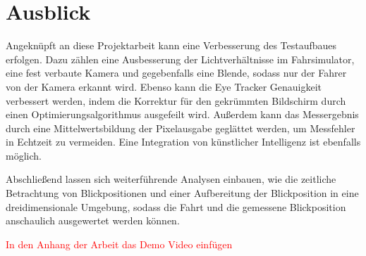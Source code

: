 \section{Ausblick}

Angeknüpft an diese Projektarbeit kann eine Verbesserung des Testaufbaues erfolgen. Dazu zählen eine Ausbesserung der Lichtverhältnisse im Fahrsimulator, eine fest verbaute Kamera und gegebenfalls eine Blende, sodass nur der Fahrer von der Kamera erkannt wird. Ebenso kann die Eye Tracker Genauigkeit verbessert werden, indem die Korrektur für den gekrümmten Bildschirm durch einen Optimierungsalgorithmus ausgefeilt wird. Außerdem kann das Messergebnis durch eine Mittelwertsbildung der Pixelausgabe geglättet werden, um Messfehler in Echtzeit zu vermeiden. Eine Integration von künstlicher Intelligenz ist ebenfalls möglich.

Abschließend lassen sich weiterführende Analysen einbauen, wie die zeitliche Betrachtung von Blickpositionen und einer Aufbereitung der Blickposition in eine dreidimensionale Umgebung, sodass die Fahrt und die gemessene Blickposition anschaulich ausgewertet werden können.

\textcolor{red}{In den Anhang der Arbeit das Demo Video einfügen}

\clearpage

\printglossaries
\printbibliography
